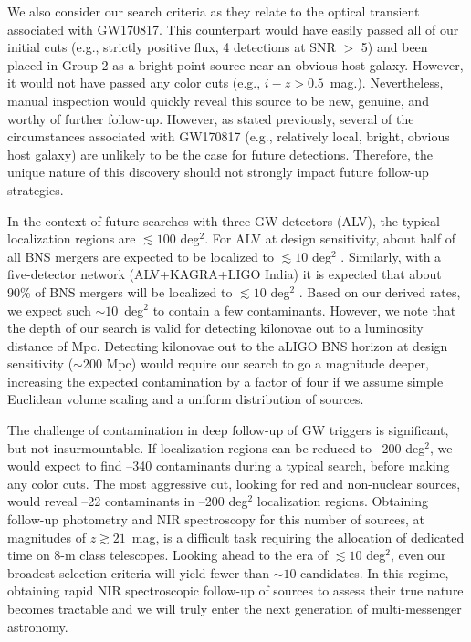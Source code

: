 We also consider our search criteria as they relate to the optical transient associated with GW170817. This counterpart would have easily passed all of our initial cuts (e.g., strictly positive flux, 4 detections at SNR $>$ 5) and been placed in Group 2 as a bright point source near an obvious host galaxy. However, it would not have passed any color cuts (e.g., $i-z > 0.5$~mag.). Nevertheless, manual inspection would quickly reveal this source to be new, genuine, and worthy of further follow-up. However, as stated previously, several of the circumstances associated with GW170817 (e.g., relatively local, bright, obvious host galaxy) are unlikely to be the case for future detections. Therefore, the unique nature of this discovery should not strongly impact future follow-up strategies.

In the context of future searches with three GW detectors (ALV), the typical localization regions are $\lesssim 100$ deg$^2$. For ALV at design sensitivity, about half of all BNS mergers are expected to be localized to $\lesssim10$ deg$^2$ \citep{chen16}. Similarly, with a five-detector network (ALV+KAGRA+LIGO India) it is expected that about 90\% of BNS mergers will be localized to $\lesssim 10$ deg$^2$ \citep{chen16}. Based on our derived rates, we expect such $\sim 10$~deg$^{2}$ to contain a few contaminants. However, we note that the depth of our search is valid for detecting kilonovae out to a luminosity distance of  Mpc. Detecting kilonovae out to the aLIGO BNS horizon at design sensitivity ($\sim200$ Mpc) would require our search to go a magnitude deeper, increasing the expected contamination by a factor of four if we assume simple Euclidean volume scaling and a uniform distribution of sources. 

The challenge of contamination in deep follow-up of GW triggers is significant, but not insurmountable. If localization regions can be reduced to --200 deg$^2$, we would expect to find --340 contaminants during a typical search, before making any color cuts. The most aggressive cut, looking for red and non-nuclear sources, would reveal --22 contaminants in --200 deg$^2$ localization regions. Obtaining follow-up photometry and NIR spectroscopy for this number of sources, at magnitudes of $z \gtrsim 21$~mag, is a difficult task requiring the allocation of dedicated time on 8-m class telescopes. Looking ahead to the era of $\lesssim 10$ deg$^2$, even our broadest selection criteria will yield fewer than $\sim 10$ candidates. In this regime, obtaining rapid NIR spectroscopic follow-up of sources to assess their true nature becomes tractable and we will truly enter the next generation of multi-messenger astronomy.
